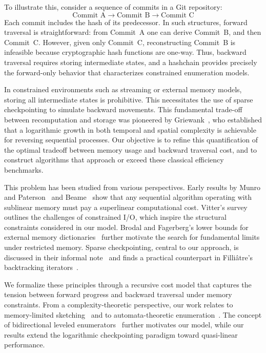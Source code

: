\documentclass[a4paper,10pt]{article}
\begin{document}
To illustrate this, consider a sequence of commits in a Git repository:
\[
\text{Commit A} \rightarrow \text{Commit B} \rightarrow \text{Commit C}
\]
Each commit includes the hash of its predecessor. In such structures, forward traversal is straightforward: from Commit~A one can derive Commit~B, and then Commit~C. However, given only Commit~C, reconstructing Commit~B is infeasible because cryptographic hash functions are one-way. Thus, backward traversal requires storing intermediate states, and a hashchain provides precisely the forward-only behavior that characterizes constrained enumeration models.

In constrained environments such as streaming or external memory models, storing all intermediate states is prohibitive. This necessitates the use of sparse checkpointing to simulate backward movements. This fundamental trade-off between recomputation and storage was pioneered by Griewank~\cite{griewank1992achieving}, who established that a logarithmic growth in both temporal and spatial complexity is achievable for reversing sequential processes. Our objective is to refine this quantification of the optimal tradeoff between memory usage and backward traversal cost, and to construct algorithms that approach or exceed these classical efficiency benchmarks.

This problem has been studied from various perspectives. Early results by Munro and Paterson~\cite{munro1980selection} and Beame~\cite{beame1991tradeoff} show that any sequential algorithm operating with sublinear memory must pay a superlinear computational cost. Vitter’s survey~\cite{vitter1999external} outlines the challenges of constrained I/O, which inspire the structural constraints considered in our model. Brodal and Fagerberg’s lower bounds for external memory dictionaries~\cite{brodal1999lower} further motivate the search for fundamental limits under restricted memory. Sparse checkpointing, central to our approach, is discussed in their informal note~\cite{brodal1999kk} and finds a practical counterpart in Filliâtre’s backtracking iterators~\cite{filliatre2006backtracking}.

We formalize these principles through a recursive cost model that captures the tension between forward progress and backward traversal under memory constraints. From a complexity-theoretic perspective, our work relates to memory-limited sketching~\cite{alon1999frequency} and to automata-theoretic enumeration~\cite{moscowjournal2020linearorders}. The concept of bidirectional leveled enumerators~\cite{hal-03197935} further motivates our model, while our results extend the logarithmic checkpointing paradigm toward quasi-linear performance.
\end{document}

